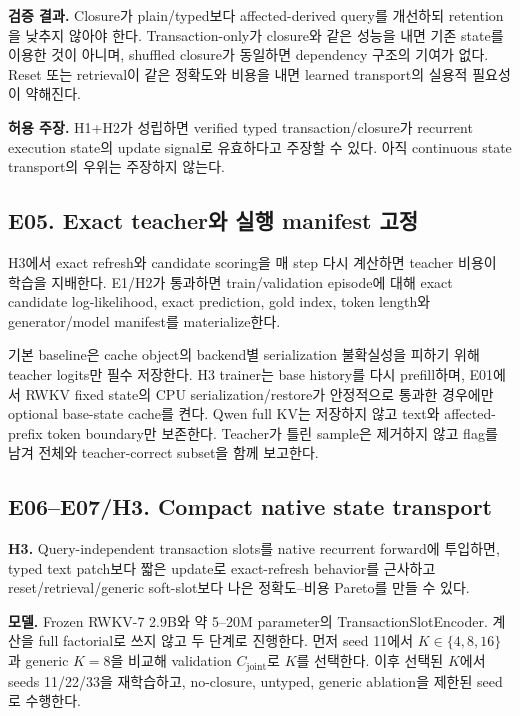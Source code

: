 \documentclass[10.5pt,a4paper]{article}
\begin{document}
\textbf{검증 결과.} Closure가 plain/typed보다 affected-derived query를 개선하되 retention을 낮추지 않아야 한다. Transaction-only가 closure와 같은 성능을 내면 기존 state를 이용한 것이 아니며, shuffled closure가 동일하면 dependency 구조의 기여가 없다. Reset 또는 retrieval이 같은 정확도와 비용을 내면 learned transport의 실용적 필요성이 약해진다.

\textbf{허용 주장.} H1+H2가 성립하면 verified typed transaction/closure가 recurrent execution state의 update signal로 유효하다고 주장할 수 있다. 아직 continuous state transport의 우위는 주장하지 않는다.

\subsection{E05. Exact teacher와 실행 manifest 고정}

H3에서 exact refresh와 candidate scoring을 매 step 다시 계산하면 teacher 비용이 학습을 지배한다. E1/H2가 통과하면 train/validation episode에 대해 exact candidate log-likelihood, exact prediction, gold index, token length와 generator/model manifest를 materialize한다.

기본 baseline은 cache object의 backend별 serialization 불확실성을 피하기 위해 teacher logits만 필수 저장한다. H3 trainer는 base history를 다시 prefill하며, E01에서 RWKV fixed state의 CPU serialization/restore가 안정적으로 통과한 경우에만 optional base-state cache를 켠다. Qwen full KV는 저장하지 않고 text와 affected-prefix token boundary만 보존한다. Teacher가 틀린 sample은 제거하지 않고 flag를 남겨 전체와 teacher-correct subset을 함께 보고한다.

\subsection{E06--E07/H3. Compact native state transport}

\begin{keybox}
\textbf{H3.} Query-independent transaction slots를 native recurrent forward에 투입하면, typed text patch보다 짧은 update로 exact-refresh behavior를 근사하고 reset/retrieval/generic soft-slot보다 나은 정확도--비용 Pareto를 만들 수 있다.
\end{keybox}

\textbf{모델.} Frozen RWKV-7 2.9B와 약 5--20M parameter의 TransactionSlotEncoder. 계산을 full factorial로 쓰지 않고 두 단계로 진행한다. 먼저 seed 11에서 $K\in\{4,8,16\}$과 generic $K=8$을 비교해 validation $C_{\mathrm{joint}}$로 $K$를 선택한다. 이후 선택된 $K$에서 seeds 11/22/33을 재학습하고, no-closure, untyped, generic ablation을 제한된 seed로 수행한다.
\end{document}
